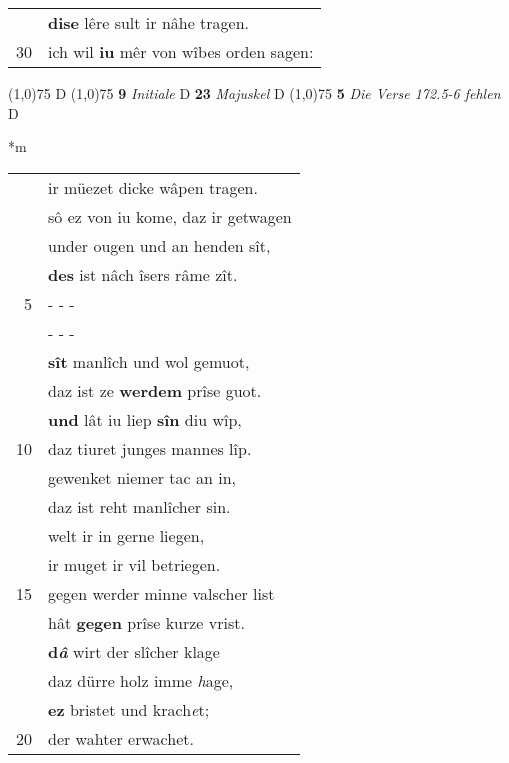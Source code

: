 \documentclass[8pt,a4paper,notitlepage]{article}
\begin{document}
\begin{table}[ht]
\begin{minipage}[t]{0.5\linewidth}
\begin{tabular}{rl}
 & \textbf{dise} lêre sult ir nâhe tragen.\\ 
30 & ich wil \textbf{iu} mêr von wîbes orden sagen:\\ 
\end{tabular}
\scriptsize
\line(1,0){75} \newline
D \newline
\line(1,0){75} \newline
\textbf{9} \textit{Initiale} D  \textbf{23} \textit{Majuskel} D  \newline
\line(1,0){75} \newline
\textbf{5} \textit{Die Verse 172.5-6 fehlen} D  \newline
\end{minipage}
\hspace{0.5cm}
\begin{minipage}[t]{0.5\linewidth}
\small
\begin{center}*m
\end{center}
\begin{tabular}{rl}
 & ir müezet dicke wâpen tragen.\\ 
 & sô ez von iu kome, daz ir getwagen\\ 
 & under ougen und an henden sît,\\ 
 & \textbf{des} ist nâch îsers râme zît.\\ 
5 & \multicolumn{1}{l}{ - - - }\\ 
 & \multicolumn{1}{l}{ - - - }\\ 
 & \textbf{sît} manlîch und wol gemuot,\\ 
 & daz ist ze \textbf{werdem} prîse guot.\\ 
 & \textbf{und} lât iu liep \textbf{sîn} diu wîp,\\ 
10 & daz tiuret junges mannes lîp.\\ 
 & gewenket niemer tac an in,\\ 
 & daz ist reht manlîcher sin.\\ 
 & welt ir in gerne liegen,\\ 
 & ir muget ir vil betriegen.\\ 
15 & gegen werder minne valscher list\\ 
 & hât \textbf{gegen} prîse kurze vrist.\\ 
 & \textbf{d\textit{â}} wirt der slîcher klage\\ 
 & daz dürre holz imme \textit{h}age,\\ 
 & \textbf{ez} bristet und krach\textit{e}t;\\ 
20 & der wahter erwachet.\\ 

\end{tabular}
\end{minipage}
\end{table}
\end{document}
